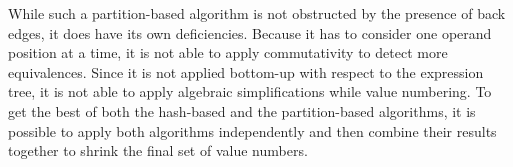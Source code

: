 While such a partition-based algorithm is not obstructed by the presence of back edges, it does have its own deficiencies. 
Because it has to consider one operand position at a time, it is not able to apply commutativity to detect more equivalences. 
Since it is not applied bottom-up with respect to the expression tree, it is not able to apply algebraic simplifications while value numbering. 
To get the best of both the hash-based and the partition-based algorithms, it is possible to apply both algorithms independently and then combine their results together to shrink the final set of value numbers.

%

